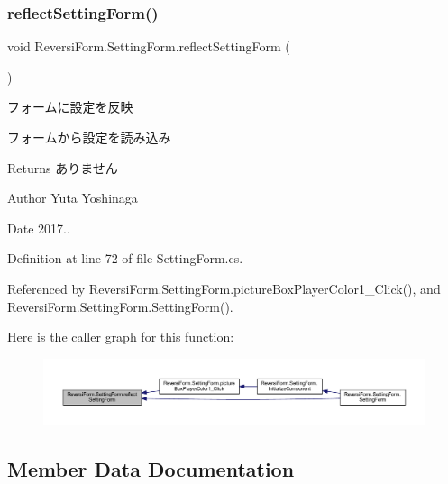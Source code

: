 \subsubsection{\texorpdfstring{reflect\+Setting\+Form()}{reflectSettingForm()}}
{\footnotesize\ttfamily void Reversi\+Form.\+Setting\+Form.\+reflect\+Setting\+Form (\begin{DoxyParamCaption}{ }\end{DoxyParamCaption})\hspace{0.3cm}{\ttfamily [private]}}



フォームに設定を反映 

フォームから設定を読み込み

\begin{DoxyReturn}{Returns}
ありません 
\end{DoxyReturn}
\begin{DoxyAuthor}{Author}
Yuta Yoshinaga 
\end{DoxyAuthor}
\begin{DoxyDate}{Date}
2017.. 
\end{DoxyDate}


Definition at line 72 of file Setting\+Form.\+cs.



Referenced by Reversi\+Form.\+Setting\+Form.\+picture\+Box\+Player\+Color1\+\_\+\+Click(), and Reversi\+Form.\+Setting\+Form.\+Setting\+Form().

Here is the caller graph for this function\+:\nopagebreak
\begin{figure}[H]
\begin{center}
\leavevmode
\includegraphics[width=350pt]{class_reversi_form_1_1_setting_form_a7ede223d806bde4aeb790ade207ad677_icgraph}
\end{center}
\end{figure}


\subsection{Member Data Documentation}
\mbox{\label{class_reversi_form_1_1_setting_form_af7d6ca70cbe9baa786a42f9e3139c942}} 
